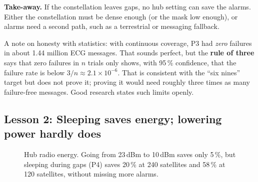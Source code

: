 \documentclass[11pt,a4paper]{article}
\newcommand{\kt}[1]{\textbf{\color{navy}#1}}
\newcommand{\insight}[1]{\begin{idea}\textsf{\textbf{\color{amber!80!black}Take-away.}} #1\end{idea}}
\begin{document}
\insight{If the constellation leaves gaps, no hub setting can save the alarms. Either the constellation must be dense enough (or the mask low enough), or alarms need a second path, such as a terrestrial or messaging fallback.}

A note on honesty with statistics: with continuous coverage, P3 had \emph{zero} failures in about 1.44 million ECG messages. That sounds perfect, but the \kt{rule of three} says that zero failures in $n$ trials only shows, with 95\,\% confidence, that the failure rate is below $3/n \approx 2.1\times10^{-6}$. That is consistent with the ``six nines'' target but does not prove it; proving it would need roughly three times as many failure-free messages. Good research states such limits openly.

\subsection{Lesson 2: Sleeping saves energy; lowering power hardly does}

\begin{figure}[h]
\centering
{}
\caption{Hub radio energy. Going from 23\,dBm to 10\,dBm saves only 5\,\%, but sleeping during gaps (P4) saves 20\,\% at 240 satellites and 58\,\% at 120 satellites, without missing more alarms.}\label{fig:energy}
\end{figure}
\end{document}
